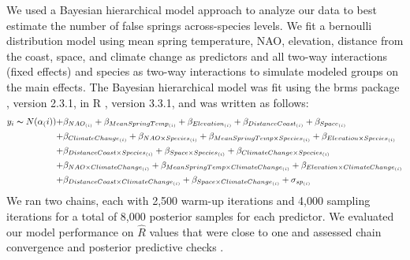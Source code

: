 \documentclass{article}\usepackage[]{graphicx}\usepackage[]{color}
\begin{document}
We used a Bayesian hierarchical model approach to analyze our data to best estimate the number of false springs across-species levels. We fit a bernoulli distribution model using mean spring temperature, NAO, elevation, distance from the coast, space, and climate change as predictors and all two-way interactions (fixed effects) and species as two-way interactions to simulate modeled groups on the main effects. The Bayesian hierarchical model was fit using the brms package \citep{brms}, version 2.3.1,  in R \citep{R}, version 3.3.1, and was written as follows: 
\begin{align*} \label{eq:1} 
y_i \thicksim N(\alpha_(i)) +&  \beta_{NAO_{(i)}} + \beta_{MeanSpringTemp_{(i)}} + \beta_{Elevation_{(i)}} + \beta_{DistanceCoast_{(i)}} + \beta_{Space_{(i)}} \\ +& \beta_{ClimateChange_{(i)}}
+ \beta_{NAO \times Species_{(i)}} + \beta_{MeanSpringTemp \times Species_{(i)}} + \beta_{Elevation \times Species_{(i)}} \\ +& \beta_{DistanceCoast \times Species_{(i)}} + \beta_{Space \times Species_{(i)}} + \beta_{ClimateChange \times Species_{(i)}} \\
+& \beta_{NAO \times ClimateChange_{(i)}} + \beta_{MeanSpringTemp \times ClimateChange_{(i)}} 
+ \beta_{Elevation \times ClimateChange_{(i)}} \\ +& \beta_{DistanceCoast \times ClimateChange_{(i)}} + \beta_{Space \times ClimateChange_{(i)}} + \sigma_{sp_{(i)}} 
\end{align*}
We ran two chains, each with 2,500 warm-up iterations and 4,000 sampling iterations for a total of 8,000 posterior samples for each predictor. We evaluated our model performance on $\hat{R}$ values that were close to one and assessed chain convergence and posterior predictive checks \citep{Gelman2006}.
\end{document}
